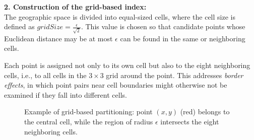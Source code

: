 \documentclass[sigconf,nonacm]{acmart}
\begin{document}
\textbf{2. Construction of the grid-based index:} \\
The geographic space is divided into equal-sized cells, where the cell size is defined as $gridSize = \frac{\epsilon}{\sqrt{2}}$. This value is chosen so that candidate points whose Euclidean distance may be at most $\epsilon$ can be found in the same or neighboring cells.

Each point is assigned not only to its own cell but also to the eight neighboring cells, i.e., to all cells in the $3\times3$ grid around the point. This addresses \textit{border effects}, in which point pairs near cell boundaries might otherwise not be examined if they fall into different cells.

\begin{figure}[t]
\centering
{}
\caption{Example of grid-based partitioning: point $(x,y)$ (red) belongs to the central cell, while the region of radius $\epsilon$ intersects the eight neighboring cells.}\label{fig:grid-example}
\end{figure}
\end{document}
